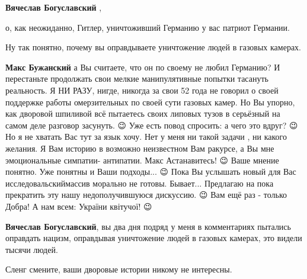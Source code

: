 \begin{itemize}
\begin{itemize}
 
\textbf{Вячеслав Богуславский} , 

о, как неожиданно, Гитлер, уничтоживший Германию у вас патриот Германии.

Ну так понятно, почему вы оправдываете уничтожение людей в газовых камерах.

 
\textbf{Макс Бужанский} а Вы считаете, что он по своему не любил Германию? И
перестаньте продолжать свои мелкие манипулятивные попытки тасануть реальность.
Я НИ РАЗУ, нигде, никогда за свои 52 года не говорил о своей поддержке работы
омерзительных по своей сути газовых камер. Но Вы упорно, как дворовой шпиливой
всё пытаетесь своих липовых тузов в серьёзный на самом деле разговор засунуть.
😉 Уже есть повод спросить: а чего это вдруг? 😉 Но я не хватать Вас тут за
язык хочу. Нет у меня ни такой задачи , ни какого желания. Я Вам историю в
возможно неизвестном Вам ракурсе, а Вы мне эмоциональные симпатии- антипатии.
Макс Астанавитесь! 😉 Ваше мнение понятно. Уже понятны и Ваши подходы... 😉
Пока Вы услышать новый для Вас исследовальскиймассив морально не готовы.
Бывает... Предлагаю на пока прекратить эту нашу недополучившуюся дискуссию. 😉
Вам ещё раз - только Добра! А нам всем: України квітучої! 😉

 
\textbf{Вячеслав Богуславский}, вы два дня подряд у меня в комментариях
пытались оправдать нацизм, оправдывая уничтожение людей в газовых камерах, это
видели тысячи людей.

Сленг смените, ваши дворовые истории никому не интересны.

 

\end{itemize}
\end{itemize}
